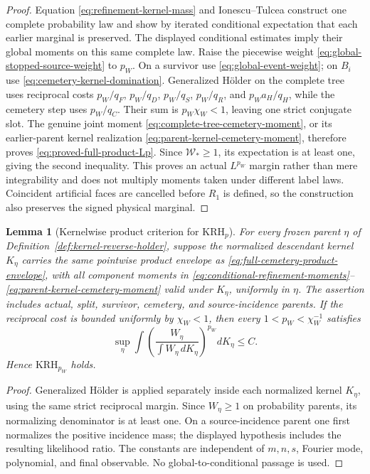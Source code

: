 \documentclass[11pt]{article}
\newtheorem{lemma}[theorem]{Lemma}
\begin{document}
\begin{proof}
Equation \eqref{eq:refinement-kernel-mass} and Ionescu--Tulcea construct one
complete probability law and show by iterated conditional expectation that
each earlier marginal is preserved.  The displayed conditional estimates
imply their global moments on this same complete law.  Raise the piecewise weight
\eqref{eq:global-stopped-source-weight} to $p_W$.  On a survivor use
\eqref{eq:global-event-weight}; on $B_i$ use
\eqref{eq:cemetery-kernel-domination}.  Generalized H\"older on the complete tree
uses reciprocal costs
$p_W/q_F$, $p_W/q_D$, $p_W/q_S$, $p_W/q_R$, and
$p_Wa_H/q_H$, while the cemetery step uses $p_W/q_C$.  Their sum is
$p_W\chi_W<1$, leaving one strict conjugate slot.  The genuine joint moment
\eqref{eq:complete-tree-cemetery-moment}, or its earlier-parent kernel
realization \eqref{eq:parent-kernel-cemetery-moment}, therefore proves
\eqref{eq:proved-full-product-Lp}.  Since $\mathscr W_*\ge1$, its expectation
is at least one, giving the second inequality.  This proves an actual
$L^{p_W}$ margin rather than mere integrability and does not multiply moments
taken under different label laws.
Coincident artificial faces are cancelled before $R_1$ is defined, so the
construction also preserves the signed physical marginal.
\end{proof}

\begin{lemma}[Kernelwise product criterion for \(\mathrm{KRH}_p\)]
\label{lem:kernelwise-product-KRH}
For every frozen parent $\eta$ of
Definition~\ref{def:kernel-reverse-holder}, suppose the normalized descendant
kernel $K_\eta$ carries the same pointwise product envelope as
\eqref{eq:full-cemetery-product-envelope}, with all component moments in
\eqref{eq:conditional-refinement-moments}--
\eqref{eq:parent-kernel-cemetery-moment} valid under $K_\eta$, uniformly in
$\eta$.  The assertion includes actual, split, survivor, cemetery, and
source-incidence parents.  If the reciprocal cost is bounded uniformly by
$\chi_W<1$, then every $1<p_W<\chi_W^{-1}$ satisfies
\begin{equation}
\label{eq:kernelwise-product-KRH}
 \sup_\eta\int
 \left(\frac{W_\eta}{\int W_\eta\,dK_\eta}\right)^{p_W}dK_\eta\le C.
\end{equation}
Hence \(\mathrm{KRH}_{p_W}\) holds.
\end{lemma}

\begin{proof}
Generalized H\"older is applied separately inside each normalized kernel
$K_\eta$, using the same strict reciprocal margin.  Since $W_\eta\ge1$ on
probability parents, its normalizing denominator is at least one.  On a
source-incidence parent one first normalizes the positive incidence mass;
the displayed hypothesis includes the resulting likelihood ratio.  The
constants are independent of $m,n,s$, Fourier mode, polynomial, and final
observable.  No global-to-conditional passage is used.
\end{proof}
\end{document}
